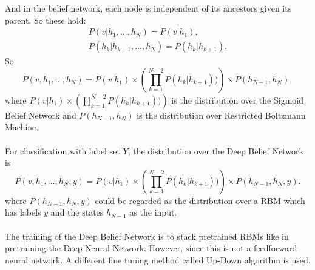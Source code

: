 \documentclass[12pt]{article}
\begin{document}
And in the belief network, each node is independent of its ancestors given its parent. So these hold:\begin{gather}
P(v| h_1, ..., h_N) = P(v|h_1),\\
P(h_k| h_{k+1},..., h_{N}) = P(h_k| h_{k+1}).
\end{gather}
So \begin{equation}
P(v, h_1, ..., h_N)  = P(v| h_1) \times\left(\prod_{k=1}^{N-2}  P(h_k| h_{k+1}))\right)\times P(h_{N-1},h_N),
\end{equation}
where $P(v| h_1) \times\left(\prod_{k=1}^{N-2}  P(h_k| h_{k+1}))\right)$ is the distribution over the Sigmoid Belief Network and $P(h_{N-1},h_N)$ is the distribution over Restricted Boltzmann Machine.\\
\\
For classification with label set $Y$, the distribution over the Deep Belief Network is
\begin{equation}
P(v, h_1, ..., h_N, y)  = P(v| h_1) \times\left(\prod_{k=1}^{N-2}  P(h_k| h_{k+1}))\right)\times P(h_{N-1},h_N, y).
\end{equation}
where $P(h_{N-1},h_N, y)$ could be regarded as the distribution over a RBM which has labels $y$ and the states $h_{N-1}$ as the input.\\
\\
The training of the Deep Belief Network is to stack pretrained RBMs like in pretraining the Deep Neural Network. However, since this is not a feedforward neural network. A different fine tuning method called Up-Down algorithm is used.
\end{document}
